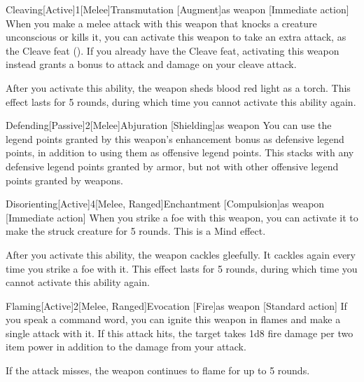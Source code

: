 \begin{magicitemdef}{Cleaving}[Active]{1}[Melee]{Transmutation [Augment]}{as weapon}
    [Immediate action] When you make a melee attack with this weapon that knocks a creature unconscious or kills it, you can activate this weapon to take an extra attack, as the Cleave feat ().
    If you already have the Cleave feat, activating this weapon instead grants a  bonus to attack and damage on your cleave attack.

    After you activate this ability, the weapon sheds blood red light as a torch.
    This effect lasts for 5 rounds, during which time you cannot activate this ability again.
\end{magicitemdef}

\begin{magicitemdef}{Defending}[Passive]{2}[Melee]{Abjuration [Shielding]}{as weapon}
     You can use the legend points granted by this weapon's enhancement bonus as defensive legend points, in addition to using them as offensive legend points.
    This stacks with any defensive legend points granted by armor, but not with other offensive legend points granted by weapons.
\end{magicitemdef}

\begin{magicitemdef}{Disorienting}[Active]{4}[Melee, Ranged]{Enchantment [Compulsion]}{as weapon}
    [Immediate action] When you strike a foe with this weapon, you can activate it to make the struck creature \disoriented for 5 rounds.
    This is a Mind effect.

    After you activate this ability, the weapon cackles gleefully.
    It cackles again every time you strike a foe with it.
    This effect lasts for 5 rounds, during which time you cannot activate this ability again.
\end{magicitemdef}

\begin{magicitemdef}{Flaming}[Active]{2}[Melee, Ranged]{Evocation [Fire]}{as weapon}
    [Standard action] If you speak a command word, you can ignite this weapon in flames and make a single attack with it. If this attack hits, the target takes 1d8 fire damage per two item power in addition to the damage from your attack.

    If the attack misses, the weapon continues to flame for up to 5 rounds.
\end{magicitemdef}

